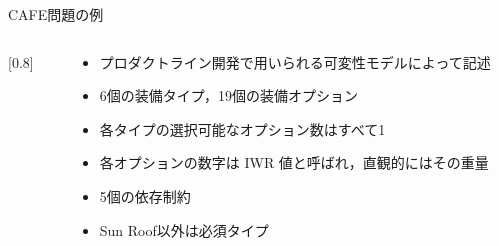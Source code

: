 \documentclass[dvipdfmx, 11pt]{beamer}
\begin{document}
\begin{frame}{CAFE問題の例}

  \begin{columns}
    \begin{column}{0.75\linewidth}
      \scalebox{0.8}[0.8]{}
    \end{column}
    \begin{column}{0.25\linewidth}
      \begin{footnotesize}
        \begin{itemize}
        \item プロダクトライン開発で用いられる可変性モデルによって記述
        \item 6個の装備タイプ，19個の装備オプション
        \item 各タイプの選択可能なオプション数はすべて1
        \item 各オプションの数字は IWR 値と呼ばれ，直観的にはその重量
        \item 5個の依存制約
        \item \textsf{Sun Roof}以外は必須タイプ
        \end{itemize}
      \end{footnotesize}
    \end{column}
  \end{columns}
\end{frame}
\end{document}
